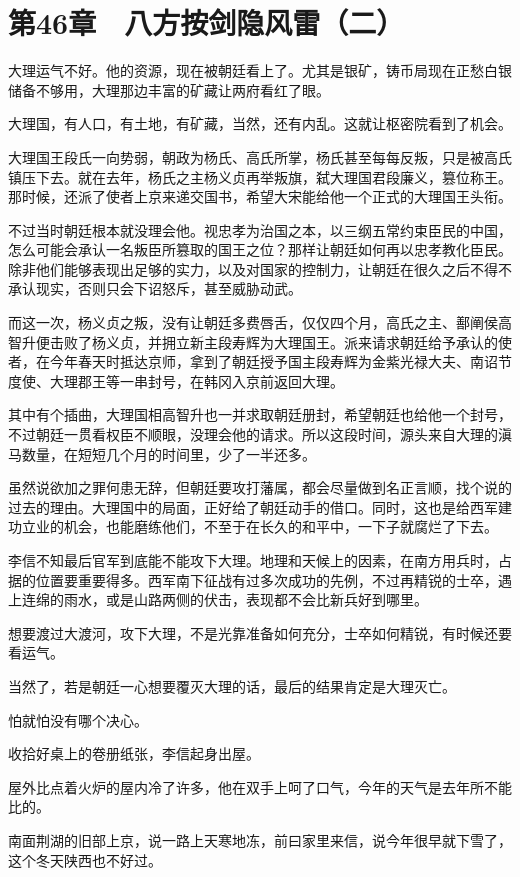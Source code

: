 \section{第46章　八方按剑隐风雷（二）}

大理运气不好。他的资源，现在被朝廷看上了。尤其是银矿，铸币局现在正愁白银储备不够用，大理那边丰富的矿藏让两府看红了眼。

大理国，有人口，有土地，有矿藏，当然，还有内乱。这就让枢密院看到了机会。

大理国王段氏一向势弱，朝政为杨氏、高氏所掌，杨氏甚至每每反叛，只是被高氏镇压下去。就在去年，杨氏之主杨义贞再举叛旗，弑大理国君段廉义，篡位称王。那时候，还派了使者上京来递交国书，希望大宋能给他一个正式的大理国王头衔。

不过当时朝廷根本就没理会他。视忠孝为治国之本，以三纲五常约束臣民的中国，怎么可能会承认一名叛臣所篡取的国王之位？那样让朝廷如何再以忠孝教化臣民。除非他们能够表现出足够的实力，以及对国家的控制力，让朝廷在很久之后不得不承认现实，否则只会下诏怒斥，甚至威胁动武。

而这一次，杨义贞之叛，没有让朝廷多费唇舌，仅仅四个月，高氏之主、鄯阐侯高智升便击败了杨义贞，并拥立新主段寿辉为大理国王。派来请求朝廷给予承认的使者，在今年春天时抵达京师，拿到了朝廷授予国主段寿辉为金紫光禄大夫、南诏节度使、大理郡王等一串封号，在韩冈入京前返回大理。

其中有个插曲，大理国相高智升也一并求取朝廷册封，希望朝廷也给他一个封号，不过朝廷一贯看权臣不顺眼，没理会他的请求。所以这段时间，源头来自大理的滇马数量，在短短几个月的时间里，少了一半还多。

虽然说欲加之罪何患无辞，但朝廷要攻打藩属，都会尽量做到名正言顺，找个说的过去的理由。大理国中的局面，正好给了朝廷动手的借口。同时，这也是给西军建功立业的机会，也能磨练他们，不至于在长久的和平中，一下子就腐烂了下去。

李信不知最后官军到底能不能攻下大理。地理和天候上的因素，在南方用兵时，占据的位置要重要得多。西军南下征战有过多次成功的先例，不过再精锐的士卒，遇上连绵的雨水，或是山路两侧的伏击，表现都不会比新兵好到哪里。

想要渡过大渡河，攻下大理，不是光靠准备如何充分，士卒如何精锐，有时候还要看运气。

当然了，若是朝廷一心想要覆灭大理的话，最后的结果肯定是大理灭亡。

怕就怕没有哪个决心。

收拾好桌上的卷册纸张，李信起身出屋。

屋外比点着火炉的屋内冷了许多，他在双手上呵了口气，今年的天气是去年所不能比的。

南面荆湖的旧部上京，说一路上天寒地冻，前曰家里来信，说今年很早就下雪了，这个冬天陕西也不好过。

